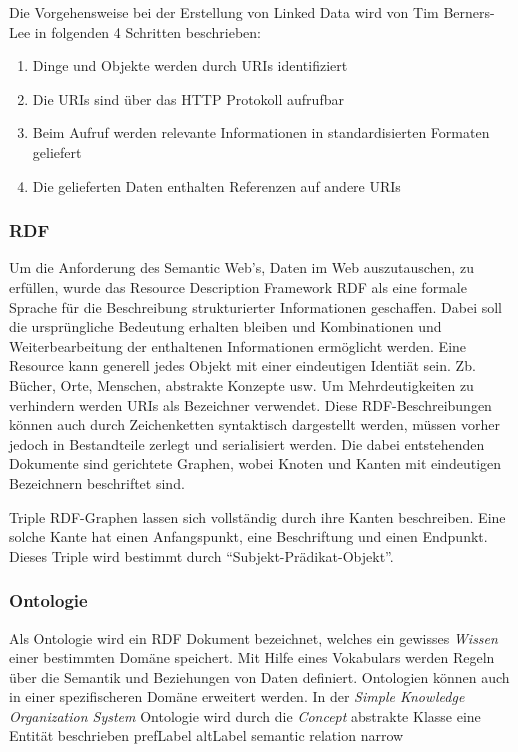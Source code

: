Die Vorgehensweise bei der Erstellung von Linked Data wird von Tim Berners-Lee in folgenden 4 Schritten beschrieben:

\begin{enumerate}
	\item Dinge und Objekte werden durch URIs identifiziert
	\item Die URIs sind über das HTTP Protokoll aufrufbar
	\item Beim Aufruf werden relevante Informationen in standardisierten Formaten geliefert
	\item Die gelieferten Daten enthalten Referenzen auf andere URIs
\end{enumerate}
\subsubsection{RDF}

Um die Anforderung des Semantic Web’s, Daten im Web auszutauschen, zu erfüllen, wurde das Resource Description Framework RDF als eine formale Sprache für die Beschreibung strukturierter Informationen geschaffen. Dabei soll die ursprüngliche Bedeutung erhalten bleiben und Kombinationen und Weiterbearbeitung der enthaltenen Informationen ermöglicht werden.
Eine Resource kann generell jedes Objekt mit einer eindeutigen Identiät sein. Zb. Bücher, Orte, Menschen, abstrakte Konzepte usw. Um Mehrdeutigkeiten zu verhindern werden URIs als Bezeichner verwendet. Diese RDF-Beschreibungen können auch durch Zeichenketten syntaktisch dargestellt werden, müssen vorher jedoch in Bestandteile zerlegt und serialisiert werden. Die dabei entstehenden Dokumente sind gerichtete Graphen, wobei Knoten und Kanten mit eindeutigen Bezeichnern beschriftet sind. 
 
Triple
RDF-Graphen lassen sich vollständig durch ihre Kanten beschreiben. Eine solche Kante hat einen Anfangspunkt, eine Beschriftung und einen Endpunkt. Dieses Triple wird bestimmt durch “Subjekt-Prädikat-Objekt”.


\subsubsection{Ontologie}

Als Ontologie wird ein RDF Dokument bezeichnet, welches ein gewisses \textit{Wissen} einer bestimmten Domäne speichert. Mit Hilfe eines Vokabulars werden Regeln über die Semantik und Beziehungen von Daten definiert. Ontologien können auch in einer spezifischeren Domäne erweitert werden. In der \textit{Simple Knowledge Organization System}  Ontologie wird durch die \textit{Concept} abstrakte Klasse eine Entität beschrieben
prefLabel
altLabel
semantic relation narrow

